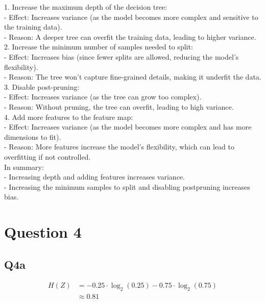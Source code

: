 \documentclass[12pt]{article}
\begin{document}
\begin{tcolorbox}[myblock, title = Answer]
  1. Increase the maximum depth of the decision tree:\\
  - Effect: Increases variance (as the model becomes more complex and sensitive to the training data).\\
  - Reason: A deeper tree can overfit the training data, leading to higher variance.\\
  2. Increase the minimum number of samples needed to split:\\
  - Effect: Increases bias (since fewer splits are allowed, reducing the model's flexibility).\\
  - Reason: The tree won't capture fine-grained details, making it underfit the data.\\
  3. Disable post-pruning:\\
  - Effect: Increases variance (as the tree can grow too complex).\\
  - Reason: Without pruning, the tree can overfit, leading to high variance.\\
  4. Add more features to the feature map:\\
  - Effect: Increases variance (as the model becomes more complex and has more dimensions to fit).\\
  - Reason: More features increase the model's flexibility, which can lead to overfitting if not controlled.\\
  
  In summary:\\
  - Increasing depth and adding features increases variance.\\
  - Increasing the minimum samples to split and disabling postpruning increases bias.\\
\end{tcolorbox}

\newpage
\section{Question 4}
\subsection{Q4a}
\begin{tcolorbox}[myblock, title = Answer]
  \begin{align*}
    H(Z) &= -0.25 \cdot \log_{2}(0.25) - 0.75 \cdot \log_{2}(0.75)\\ 
     & \approx 0.81
    \end{align*}
\end{tcolorbox}
\end{document}
